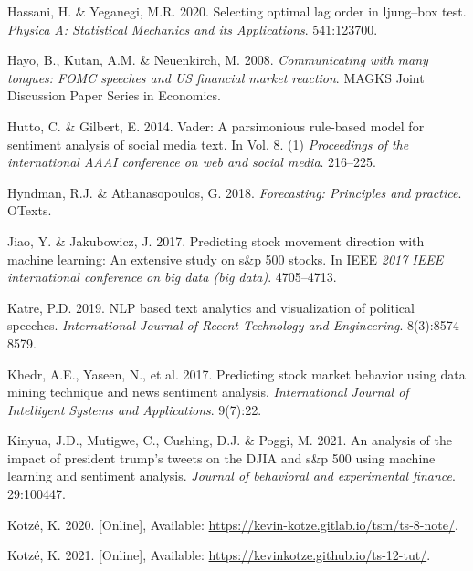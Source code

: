\documentclass[11pt,preprint, authoryear]{elsarticle}
\numberwithin{equation}{section}
\numberwithin{figure}{section}
\numberwithin{table}{section}
\newlength{\cslhangindent}
\newenvironment{CSLReferences}%
  {\setlength{\parindent}{0pt}%
  \everypar{\setlength{\hangindent}{\cslhangindent}}\ignorespaces}%
  {\par}
\begin{document}
\begin{CSLReferences}
\leavevmode{}%
Hassani, H. \& Yeganegi, M.R. 2020. Selecting optimal lag order in
ljung--box test. \emph{Physica A: Statistical Mechanics and its
Applications}. 541:123700.

\leavevmode{}%
Hayo, B., Kutan, A.M. \& Neuenkirch, M. 2008. \emph{Communicating with
many tongues: FOMC speeches and US financial market reaction}. MAGKS
Joint Discussion Paper Series in Economics.

\leavevmode{}%
Hutto, C. \& Gilbert, E. 2014. Vader: A parsimonious rule-based model
for sentiment analysis of social media text. In Vol. 8. (1)
\emph{Proceedings of the international AAAI conference on web and social
media}. 216--225.

\leavevmode{}%
Hyndman, R.J. \& Athanasopoulos, G. 2018. \emph{Forecasting: Principles
and practice}. OTexts.

\leavevmode{}%
Jiao, Y. \& Jakubowicz, J. 2017. Predicting stock movement direction
with machine learning: An extensive study on s\&p 500 stocks. In IEEE
\emph{2017 IEEE international conference on big data (big data)}.
4705--4713.

\leavevmode{}%
Katre, P.D. 2019. NLP based text analytics and visualization of
political speeches. \emph{International Journal of Recent Technology and
Engineering}. 8(3):8574--8579.

\leavevmode{}%
Khedr, A.E., Yaseen, N., et al. 2017. Predicting stock market behavior
using data mining technique and news sentiment analysis.
\emph{International Journal of Intelligent Systems and Applications}.
9(7):22.

\leavevmode{}%
Kinyua, J.D., Mutigwe, C., Cushing, D.J. \& Poggi, M. 2021. An analysis
of the impact of president trump's tweets on the DJIA and s\&p 500 using
machine learning and sentiment analysis. \emph{Journal of behavioral and
experimental finance}. 29:100447.

\leavevmode{}%
Kotzé, K. 2020. {[}Online{]}, Available:
\url{https://kevin-kotze.gitlab.io/tsm/ts-8-note/}.

\leavevmode{}%
Kotzé, K. 2021. {[}Online{]}, Available:
\url{https://kevinkotze.github.io/ts-12-tut/}.


\end{CSLReferences}
\end{document}
